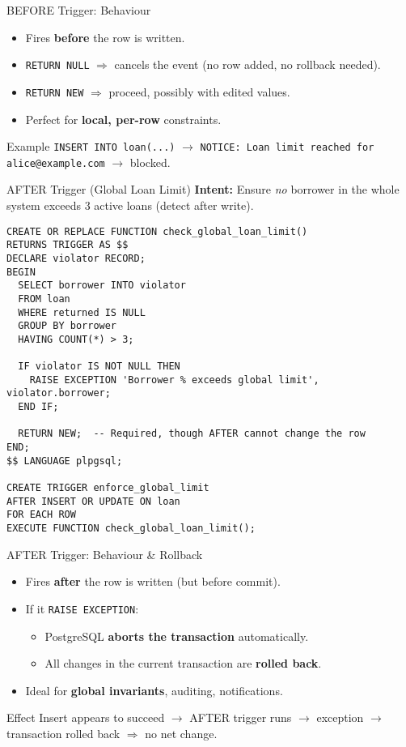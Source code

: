 \documentclass{beamer}
\begin{document}
\begin{frame}{BEFORE Trigger: Behaviour}
\begin{itemize}
  \item Fires \textbf{before} the row is written.
  \item \texttt{RETURN NULL} \(\Rightarrow\) cancels the event (no row added, no rollback needed).
  \item \texttt{RETURN NEW} \(\Rightarrow\) proceed, possibly with edited values.
  \item Perfect for \textbf{local, per-row} constraints.
\end{itemize}
\begin{block}{Example}
\texttt{INSERT INTO loan(...)} \(\rightarrow\) \texttt{NOTICE: Loan limit reached for alice@example.com} \(\rightarrow\) blocked.
\end{block}
\end{frame}

\begin{frame}[fragile]{AFTER Trigger (Global Loan Limit)}
\textbf{Intent:} Ensure \emph{no} borrower in the whole system exceeds 3 active loans (detect after write).\\[2mm]
\tiny
\begin{lstlisting}
CREATE OR REPLACE FUNCTION check_global_loan_limit()
RETURNS TRIGGER AS $$
DECLARE violator RECORD;
BEGIN
  SELECT borrower INTO violator
  FROM loan
  WHERE returned IS NULL
  GROUP BY borrower
  HAVING COUNT(*) > 3;

  IF violator IS NOT NULL THEN
    RAISE EXCEPTION 'Borrower % exceeds global limit', violator.borrower;
  END IF;

  RETURN NEW;  -- Required, though AFTER cannot change the row
END;
$$ LANGUAGE plpgsql;

CREATE TRIGGER enforce_global_limit
AFTER INSERT OR UPDATE ON loan
FOR EACH ROW
EXECUTE FUNCTION check_global_loan_limit();
\end{lstlisting}
\end{frame}

\begin{frame}{AFTER Trigger: Behaviour \& Rollback}
\begin{itemize}
  \item Fires \textbf{after} the row is written (but before commit).
  \item If it \texttt{RAISE EXCEPTION}:
    \begin{itemize}
      \item PostgreSQL \textbf{aborts the transaction} automatically.
      \item All changes in the current transaction are \textbf{rolled back}.
    \end{itemize}
  \item Ideal for \textbf{global invariants}, auditing, notifications.
\end{itemize}
\begin{block}{Effect}
Insert appears to succeed \(\rightarrow\) AFTER trigger runs \(\rightarrow\) exception \(\rightarrow\) transaction rolled back \(\Rightarrow\) no net change.
\end{block}
\end{frame}
\end{document}
